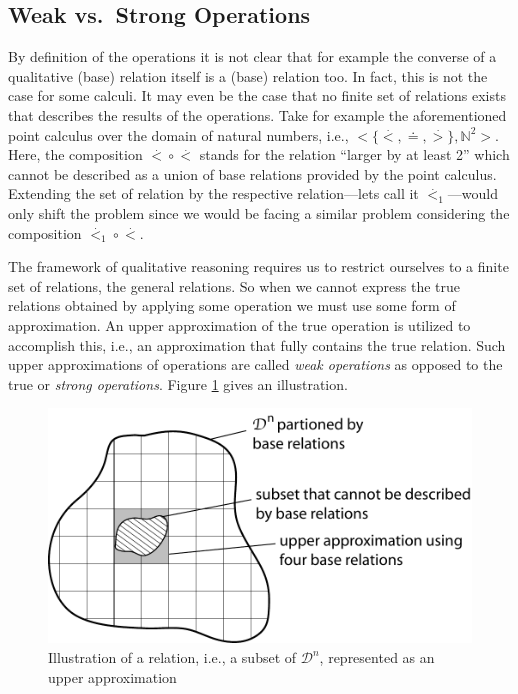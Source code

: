 \documentclass[headsepline]{scrreprt}
\newcommand{\dotl}{\stackrel{.}{<}}
\newcommand{\dotg}{\stackrel{.}{>}}
\theoremstyle{definition}
\newlength{\rest}
\begin{document}
\subsection{Weak vs.~Strong Operations}

By definition of the operations it is not clear that for example the converse of a qualitative (base) relation itself is a (base) relation too. In fact, this is not the case for some calculi. It may even be the case that no finite set of relations exists that describes the results of the operations. Take for example the aforementioned point calculus \cite{vilain_kautz_beek_89_constraint} over the domain of natural numbers, i.e., $<\{\dotl, \doteq, \dotg \}, \mathbb{N}^2>$. Here, the composition $\dotl \circ \dotl$ stands for the relation ``larger by at least 2'' which cannot be described as a union of base relations provided by the  point calculus. Extending the set of relation by the respective relation---lets call it $\dotl_{1}$---would only shift the problem since we would be facing a similar problem considering the composition $\dotl_{1} \circ \dotl$.

The framework of qualitative reasoning requires us to restrict ourselves to a finite set of relations, the general relations. So when we cannot express the true relations obtained by applying some operation we must use  some form of approximation.
An upper approximation of the true operation is utilized to accomplish this, i.e., an approximation that fully contains the true relation. Such upper approximations of operations are called {\em weak operations} as opposed to the true or {\em strong operations}. Figure \ref{FIG:weak-vs-strong} gives an illustration.

\begin{figure}
\centerline{\includegraphics[scale=.5]{weak_op}}
	\caption{\label{FIG:weak-vs-strong} Illustration of a relation, i.e., a subset of $\mathcal{D}^n$, represented as an upper approximation}
\end{figure}
\end{document}
